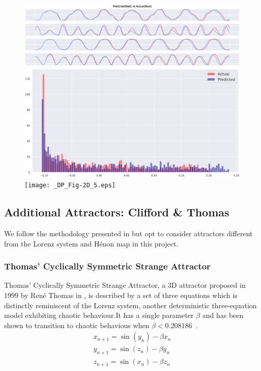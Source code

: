 \documentclass[a4paper,12pt,twoside]{report}
\begin{document}
\begin{figure}[ht]
  \centering
  \includegraphics[width=0.8\linewidth]{_DP_Fig-2F2023.eps} 
  \includegraphics[width=0.8\linewidth]{_DP_Fig-2B2023.eps}
  \texttt{[image: \_DP\_Fig-2D\_5.eps]}
    \label{fig:dp_predictions}
\end{figure}

\subsection{Additional Attractors: Clifford \& Thomas}
We follow the methodology presented in \cite{manjunath2021universal} but opt to consider attractors different from the Lorenz system and H\'enon map in this project.

\subsubsection{Thomas' Cyclically Symmetric Strange Attractor}
Thomas' Cyclically Symmetric Strange Attractor, a 3D attractor proposed in 1999 by Ren\'e Thomas in \cite{ThomasAttractor}, is described by a set of three equations which is distinctly reminiscent of the Lorenz system, another deterministic three-equation model exhibiting chaotic behaviour.It has a single parameter $\beta$ and has been shown to transition to chaotic behavious when $\beta<0.208186$~\cite{Thomas_BetaParameter}.
\begin{eqnarray}\label{eqns_thomas}
  x_{n+1} = \sin(y_n) - \beta{x_n} \\
  y_{n+1} = \sin(z_n) - \beta{y_n} \\
  z_{n+1} = \sin(x_n) - \beta{z_n}
\end{eqnarray}
\end{document}
